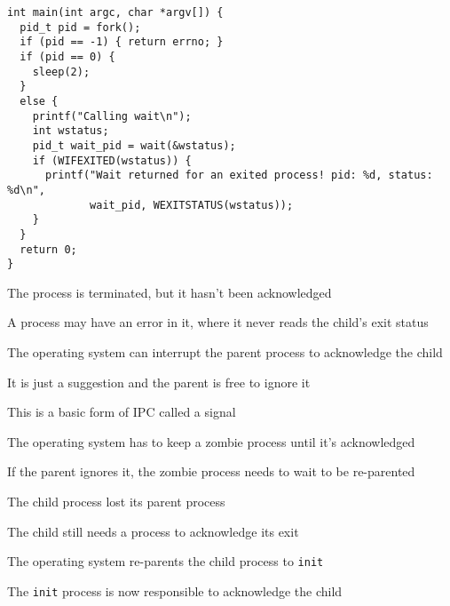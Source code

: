   \begin{slide}


    \begin{verbatim}
int main(int argc, char *argv[]) {
  pid_t pid = fork();
  if (pid == -1) { return errno; }
  if (pid == 0) {
    sleep(2);
  }
  else {
    printf("Calling wait\n");
    int wstatus;
    pid_t wait_pid = wait(&wstatus);
    if (WIFEXITED(wstatus)) {
      printf("Wait returned for an exited process! pid: %d, status: %d\n",
             wait_pid, WEXITSTATUS(wstatus));
    }
  }
  return 0;
}
    \end{verbatim}

  \end{slide}

  \begin{slide}


    The process is terminated, but it hasn't been acknowledged
    \medskip

    A process may have an error in it, where it never reads the child's exit status
    \medskip

    The operating system can interrupt the parent process to acknowledge the child

    \leftspace{}It is just a suggestion and the parent is free to ignore it

    \leftspace{}\leftspace{}This is a basic form of IPC called a signal
    \bigskip

    The operating system has to keep a zombie process until it's acknowledged

    \leftspace{}If the parent ignores it, the zombie process needs to wait to
    be re-parented
  \end{slide}

  \begin{slide}


    The child process lost its parent process

    \leftspace{}The child still needs a process to acknowledge its exit
    \medskip

    The operating system re-parents the child process to \texttt{init}

    \leftspace{}The \texttt{init} process is now responsible to acknowledge the
                 child
  \end{slide}

